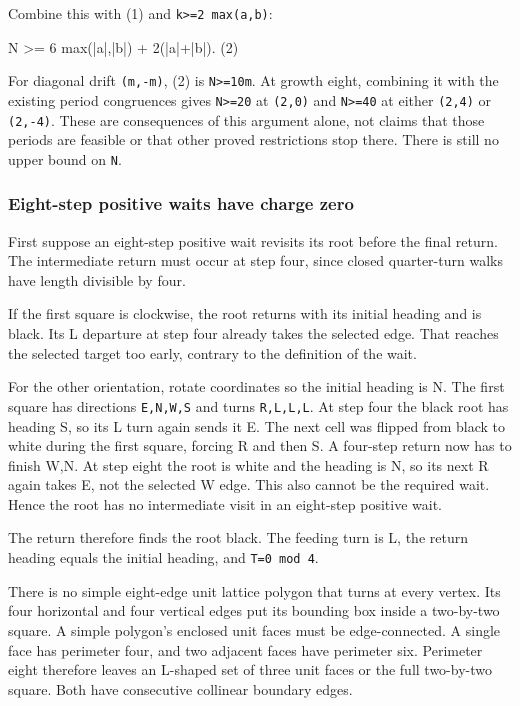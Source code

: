 \documentclass[11pt,letterpaper]{article}
\theoremstyle{plain}
\theoremstyle{definition}
\begin{document}
\begin{NoHyper}
Combine this with (1) and \texttt{k\textgreater{}=2\ max(\textbar{}a\textbar{},\textbar{}b\textbar{})}:

\begin{codeblock}
N >= 6 max(|a|,|b|) + 2(|a|+|b|).                     (2)
\end{codeblock}

For diagonal drift \texttt{(m,-m)}, (2) is \texttt{N\textgreater{}=10m}. At growth eight, combining it with the existing period congruences gives \texttt{N\textgreater{}=20} at \texttt{(2,0)} and \texttt{N\textgreater{}=40} at either \texttt{(2,4)} or \texttt{(2,-4)}. These are consequences of this argument alone, not claims that those periods are feasible or that other proved restrictions stop there. There is still no upper bound on \texttt{N}.

\subsubsection{Eight-step positive waits have charge zero}

First suppose an eight-step positive wait revisits its root before the final return. The intermediate return must occur at step four, since closed quarter-turn walks have length divisible by four.

If the first square is clockwise, the root returns with its initial heading and is black. Its L departure at step four already takes the selected edge. That reaches the selected target too early, contrary to the definition of the wait.

For the other orientation, rotate coordinates so the initial heading is N. The first square has directions \texttt{E,N,W,S} and turns \texttt{R,L,L,L}. At step four the black root has heading S, so its L turn again sends it E. The next cell was flipped from black to white during the first square, forcing R and then S. A four-step return now has to finish W,N. At step eight the root is white and the heading is N, so its next R again takes E, not the selected W edge. This also cannot be the required wait. Hence the root has no intermediate visit in an eight-step positive wait.

The return therefore finds the root black. The feeding turn is L, the return heading equals the initial heading, and \texttt{T=0\ mod\ 4}.

There is no simple eight-edge unit lattice polygon that turns at every vertex. Its four horizontal and four vertical edges put its bounding box inside a two-by-two square. A simple polygon's enclosed unit faces must be edge-connected. A single face has perimeter four, and two adjacent faces have perimeter six. Perimeter eight therefore leaves an L-shaped set of three unit faces or the full two-by-two square. Both have consecutive collinear boundary edges.


\end{NoHyper}
\end{document}
